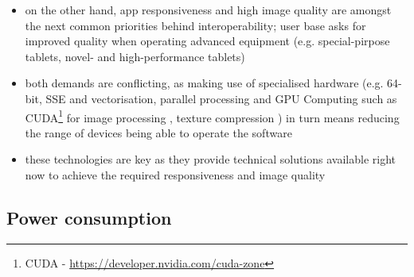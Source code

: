 \documentclass[review]{elsarticle}
\begin{document}
\begin{itemize}
\item on the other hand, app responsiveness and high image quality are amongst the next common priorities behind interoperability; user base asks for improved quality when operating advanced equipment (e.g. special-pirpose tablets, novel- and high-performance tablets)
\item both demands are conflicting, as making use of specialised hardware (e.g. 64-bit, \gls{SSE} and vectorisation, parallel processing and \gls{GPU} Computing such as CUDA\footnote{CUDA - \url{https://developer.nvidia.com/cuda-zone}} for image processing \cite{Heymann2007,Hudelist2014}, texture compression \cite{Chait2015}) in turn means reducing the range of devices being able to operate the software
\item these technologies are key as they provide technical solutions available right now to achieve the required responsiveness and image quality
\end{itemize}

%

\subsection{Power consumption}
\end{document}
